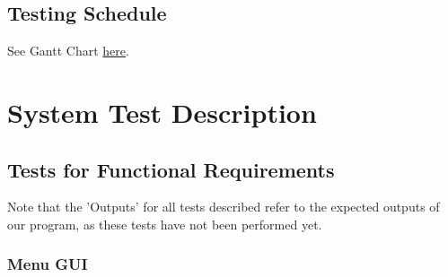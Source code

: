 \documentclass[12pt, titlepage]{article}
\begin{document}
\subsection{Testing Schedule}
		
See Gantt Chart \hyperref[gantt]{here}.

\section{System Test Description}
\label{se:STD}
	
\subsection{Tests for Functional Requirements}
Note that the 'Outputs' for all tests described refer to the expected outputs of our program, as these tests have not been performed yet. 

\subsubsection{Menu GUI}
\end{document}
